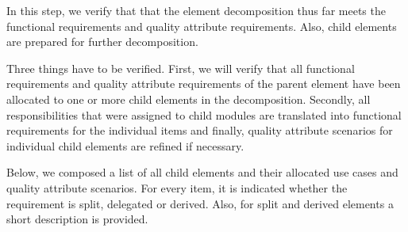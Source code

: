 \npar In this step, we verify that that the element decomposition thus far meets
the functional requirements and quality attribute requirements. Also, child
elements are prepared for further decomposition.

\npar Three things have to be verified. First, we will verify that all
functional requirements and quality attribute requirements of the parent element
have been allocated to one or more child elements in the decomposition.
Secondly, all responsibilities that were assigned to child modules are
translated into functional requirements for the individual items and finally,
quality attribute scenarios for individual child elements are refined if
necessary.

\npar Below, we composed a list of all child elements and their allocated use
cases and quality attribute scenarios. For every item, it is indicated whether
the requirement is split, delegated or derived. Also, for split and derived
elements a short description is provided.

